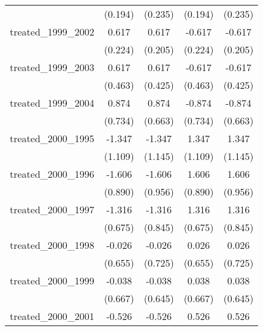 {\begin{tabular}{l*{4}{c}}
            &     (0.194)         &     (0.235)         &     (0.194)         &     (0.235)         \\
[1em]
treated\_1999\_2002&       0.617\sym{**} &       0.617\sym{**} &      -0.617\sym{**} &      -0.617\sym{**} \\
            &     (0.224)         &     (0.205)         &     (0.224)         &     (0.205)         \\
[1em]
treated\_1999\_2003&       0.617         &       0.617         &      -0.617         &      -0.617         \\
            &     (0.463)         &     (0.425)         &     (0.463)         &     (0.425)         \\
[1em]
treated\_1999\_2004&       0.874         &       0.874         &      -0.874         &      -0.874         \\
            &     (0.734)         &     (0.663)         &     (0.734)         &     (0.663)         \\
[1em]
treated\_2000\_1995&      -1.347         &      -1.347         &       1.347         &       1.347         \\
            &     (1.109)         &     (1.145)         &     (1.109)         &     (1.145)         \\
[1em]
treated\_2000\_1996&      -1.606         &      -1.606         &       1.606         &       1.606         \\
            &     (0.890)         &     (0.956)         &     (0.890)         &     (0.956)         \\
[1em]
treated\_2000\_1997&      -1.316         &      -1.316         &       1.316         &       1.316         \\
            &     (0.675)         &     (0.845)         &     (0.675)         &     (0.845)         \\
[1em]
treated\_2000\_1998&      -0.026         &      -0.026         &       0.026         &       0.026         \\
            &     (0.655)         &     (0.725)         &     (0.655)         &     (0.725)         \\
[1em]
treated\_2000\_1999&      -0.038         &      -0.038         &       0.038         &       0.038         \\
            &     (0.667)         &     (0.645)         &     (0.667)         &     (0.645)         \\
[1em]
treated\_2000\_2001&      -0.526         &      -0.526         &       0.526         &       0.526         \\

\end{tabular}}

